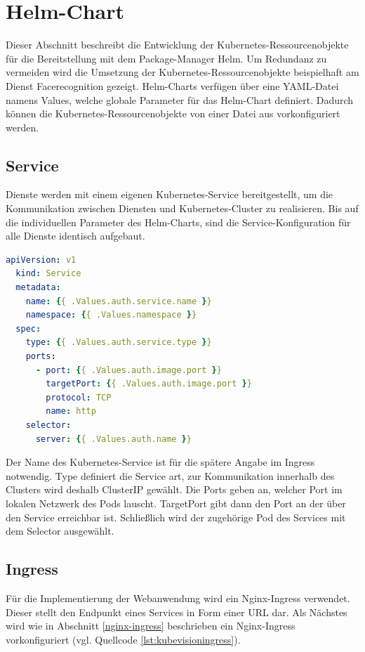 \section{Helm-Chart}
Dieser Abschnitt beschreibt die Entwicklung der Kubernetes-Ressourcenobjekte für die Bereitstellung mit dem Package-Manager Helm.
Um Redundanz zu vermeiden wird die Umsetzung der Kubernetes-Ressourcenobjekte beispielhaft am Dienst Facerecognition gezeigt.
Helm-Charts verfügen über eine YAML-Datei namens Values, welche globale Parameter für das Helm-Chart definiert.
Dadurch können die Kubernetes-Ressourcenobjekte von einer Datei aus vorkonfiguriert werden.



\subsection{Service}
Dienste werden mit einem eigenen Kubernetes-Service bereitgestellt, um die Kommunikation zwischen Diensten und Kubernetes-Cluster zu realisieren.
Bis auf die individuellen Parameter des Helm-Charts, sind die Service-Konfiguration für alle Dienste identisch aufgebaut.

\begin{lstlisting}[caption={auth-service.yaml},captionpos=b,label={lst:service},language=yaml]
  apiVersion: v1
  kind: Service
  metadata:
    name: {{ .Values.auth.service.name }}
    namespace: {{ .Values.namespace }}
  spec:
    type: {{ .Values.auth.service.type }}
    ports:
      - port: {{ .Values.auth.image.port }}
        targetPort: {{ .Values.auth.image.port }}
        protocol: TCP
        name: http
    selector:
      server: {{ .Values.auth.name }}

\end{lstlisting}

Der Name des Kubernetes-Service ist für die spätere Angabe im Ingress notwendig.
Type definiert die Service art, zur Kommunikation innerhalb des Clusters wird deshalb ClusterIP gewählt.
Die Ports geben an, welcher Port im lokalen Netzwerk des Pods lauscht.
TargetPort gibt dann den Port an der über den Service erreichbar ist.
Schließlich wird der zugehörige Pod des Services mit dem Selector ausgewählt.


\subsection{Ingress}

Für die Implementierung der Webanwendung wird ein Nginx-Ingress verwendet.
Dieser stellt den Endpunkt eines Services in Form einer URL dar.
Als Nächstes wird wie in Abschnitt \ref{nginx-ingress} beschrieben ein Nginx-Ingress vorkonfiguriert (vgl. Quellcode \ref{lst:kubevisioningress}).


